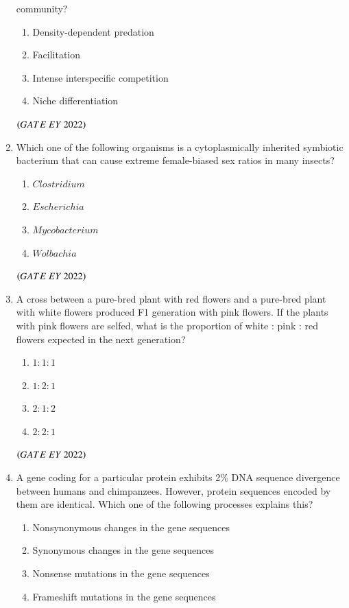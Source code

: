 \documentclass[journal]{IEEEtran}
\numberwithin{equation}{enumi}
\numberwithin{figure}{enumi}
\begin{document}
\begin{enumerate}
community?
    \begin{enumerate}
        \item  Density-dependent predation
        \item  Facilitation
        \item  Intense interspecific competition
        \item  Niche differentiation
    \end{enumerate}
    \hfill{$\brak{ GATE\ EY\ 2022}$}
    \bigskip
 \item Which one of the following organisms is a cytoplasmically inherited symbiotic
bacterium that can cause extreme female-biased sex ratios in many insects?
    \begin{enumerate}
        \item  $Clostridium$
        \item  $Escherichia$
        \item  $Mycobacterium$
        \item  $Wolbachia$
    \end{enumerate}
    \hfill{$\brak{ GATE\ EY\ 2022}$}
    \bigskip
 \item A cross between a pure-bred plant with red flowers and a pure-bred plant with
white flowers produced F1 generation with pink flowers. If the plants with pink
flowers are selfed, what is the proportion of white : pink : red flowers expected in
the next generation?
    \begin{enumerate}
        \item  $1 : 1 : 1$
        \item  $1 : 2 : 1$
        \item  $2 : 1 : 2$
        \item  $2 : 2 : 1$
    \end{enumerate}
    \hfill{$\brak{ GATE\ EY\ 2022}$}
    \bigskip
 \item A gene coding for a particular protein exhibits 2\% DNA sequence divergence
between humans and chimpanzees. However, protein sequences encoded by them
are identical. Which one of the following processes explains this?
    \begin{enumerate}
        \item  Nonsynonymous changes in the gene sequences
        \item  Synonymous changes in the gene sequences
        \item  Nonsense mutations in the gene sequences
        \item  Frameshift mutations in the gene sequences

\end{enumerate}
\end{enumerate}
\end{document}
